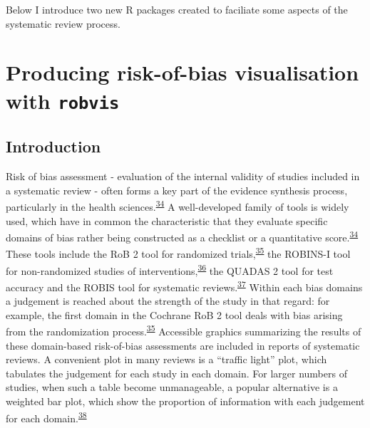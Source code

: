 \documentclass[a4paper, twoside]{templates/ociamthesis}
\begin{document}
Below I introduce two new R packages created to faciliate some aspects of the systematic review process.

\hypertarget{producing-risk-of-bias-visualisation-with-robvis}{%
\section{\texorpdfstring{Producing risk-of-bias visualisation with \texttt{robvis}}{Producing risk-of-bias visualisation with robvis}}\label{producing-risk-of-bias-visualisation-with-robvis}}

\hypertarget{introduction}{%
\subsection{Introduction}\label{introduction}}

Risk of bias assessment - evaluation of the internal validity of studies included in a systematic review - often forms a key part of the evidence synthesis process, particularly in the health sciences.\textsuperscript{\protect\hyperlink{ref-cochranechpt7}{34}} A well-developed family of tools is widely used, which have in common the characteristic that they evaluate specific domains of bias rather being constructed as a checklist or a quantitative score.\textsuperscript{\protect\hyperlink{ref-cochranechpt7}{34}} These tools include the RoB 2 tool for randomized trials,\textsuperscript{\protect\hyperlink{ref-sterne2019rob}{35}} the ROBINS-I tool for non-randomized studies of interventions,\textsuperscript{\protect\hyperlink{ref-sterne2016robins}{36}} the QUADAS 2 tool for test accuracy and the ROBIS tool for systematic reviews.\textsuperscript{\protect\hyperlink{ref-whiting2011quadas}{37}} Within each bias domains a judgement is reached about the strength of the study in that regard: for example, the first domain in the Cochrane RoB 2 tool deals with bias arising from the randomization process.\textsuperscript{\protect\hyperlink{ref-sterne2019rob}{35}} Accessible graphics summarizing the results of these domain-based risk-of-bias assessments are included in reports of systematic reviews. A convenient plot in many reviews is a ``traffic light'' plot, which tabulates the judgement for each study in each domain. For larger numbers of studies, when such a table become unmanageable, a popular alternative is a weighted bar plot, which show the proportion of information with each judgement for each domain.\textsuperscript{\protect\hyperlink{ref-higgins2008assessing}{38}}
\end{document}

